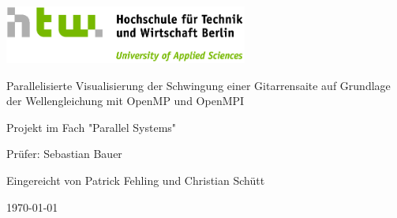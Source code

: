 \documentclass[12pt,a4paper,ngerman]{article}
\begin{document}
\begin{titlepage}
\thispagestyle{empty}

\begin{center}
	\includegraphics[width=0.6\textwidth]{pictures/HTW_Logo}
	
	\vspace{2cm}
	
	\Huge 
	Parallelisierte Visualisierung der Schwingung einer Gitarrensaite auf Grundlage der Wellengleichung mit OpenMP und OpenMPI
	
	\vspace{2cm}
	\large
	Projekt im Fach "Parallel Systems"
	
	\vspace{2cm}
	
	Prüfer: Sebastian Bauer
	
	\vspace{0.5cm}
	
	Eingereicht von Patrick Fehling und Christian Schütt
	
	\vspace{0.5cm}
	
	\today
\end{center}


\end{titlepage}

\pagestyle{empty}

\tableofcontents
\setcounter{page}{0}

\clearpage{}
\pagestyle{fancy}









\end{document}
